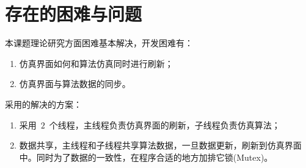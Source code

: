 \section{存在的困难与问题}

本课题理论研究方面困难基本解决，开发困难有：
\begin{enumerate}
    \item 仿真界面如何和算法仿真同时进行刷新；
    \item 仿真界面与算法数据的同步。
\end{enumerate}

采用的解决的方案：
\begin{enumerate}
    \item 采用~$2$~个线程，主线程负责仿真界面的刷新，子线程负责仿真算法；
    \item 数据共享，主线程和子线程共享算法数据，一旦数据更新，刷新到仿真界面中。同时为了数据的一致性，在程序合适的地方加排它锁(Mutex)。
\end{enumerate}
